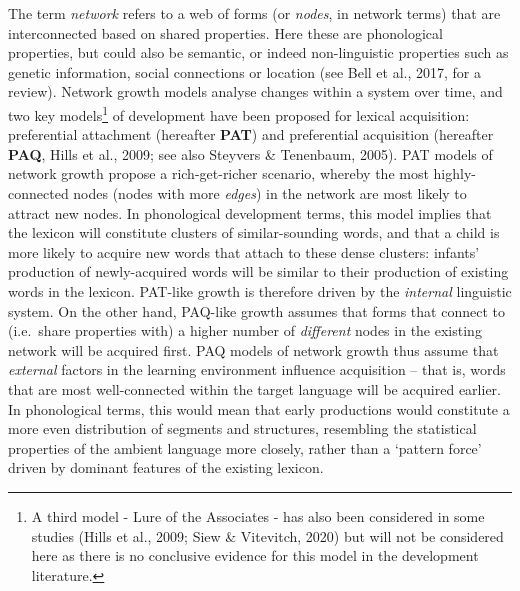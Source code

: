 \documentclass[
  man,mask,floatsintext]{apa6}
\begin{document}
The term \emph{network} refers to a web of forms (or \emph{nodes}, in network terms) that are interconnected based on shared properties. Here these are phonological properties, but could also be semantic, or indeed non-linguistic properties such as genetic information, social connections or location (see Bell et al., 2017, for a review). Network growth models analyse changes within a system over time, and two key models\footnote{A third model - Lure of the Associates - has also been considered in some studies (Hills et al., 2009; Siew \& Vitevitch, 2020) but will not be considered here as there is no conclusive evidence for this model in the development literature.} of development have been proposed for lexical acquisition: preferential attachment (hereafter \textbf{PAT}) and preferential acquisition (hereafter \textbf{PAQ}, Hills et al., 2009; see also Steyvers \& Tenenbaum, 2005). PAT models of network growth propose a rich-get-richer scenario, whereby the most highly-connected nodes (nodes with more \emph{edges}) in the network are most likely to attract new nodes. In phonological development terms, this model implies that the lexicon will constitute clusters of similar-sounding words, and that a child is more likely to acquire new words that attach to these dense clusters: infants' production of newly-acquired words will be similar to their production of existing words in the lexicon. PAT-like growth is therefore driven by the \emph{internal} linguistic system. On the other hand, PAQ-like growth assumes that forms that connect to (i.e.~share properties with) a higher number of \emph{different} nodes in the existing network will be acquired first. PAQ models of network growth thus assume that \emph{external} factors in the learning environment influence acquisition -- that is, words that are most well-connected within the target language will be acquired earlier. In phonological terms, this would mean that early productions would constitute a more even distribution of segments and structures, resembling the statistical properties of the ambient language more closely, rather than a `pattern force' driven by dominant features of the existing lexicon.
\end{document}
